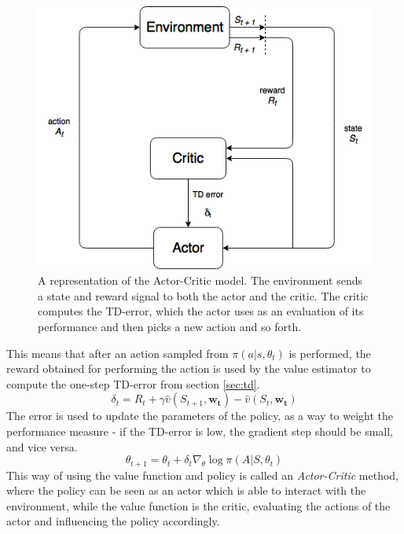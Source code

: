 \documentclass[11pt]{article}
\begin{document}
\begin{figure}[!h]
    \centering
    \includegraphics[scale = 0.5]{include/ActorCriticDiagram.png}
    \caption{A representation of the Actor-Critic model.
        The environment sends a state and reward signal to both the actor and the critic.
        The critic computes the TD-error, which the actor uses as an evaluation of its performance
        and then picks a new action and so forth.}
    \label{fig:actor-critic}
\end{figure}

This means that after an action sampled from $\pi(a|s,\theta_t)$ is performed,
the reward obtained for performing the action is used by the value estimator to
compute the one-step TD-error from section \ref{sec:td}.
\begin{equation*}
    \delta_t =  R_t + \gamma \hat{v} (S_{t+1}, \mathbf{w_t}) - \hat{v}(S_t, \mathbf{w_t})
\end{equation*}
The error is used to update the parameters of the policy,
as a way to weight the performance measure - if the TD-error is low,
the gradient step should be small, and vice versa.
\begin{equation}\label{eq:ac_theta}
    \theta_{t+1} = \theta_t + \delta_t \nabla_{\theta} \log \pi(A | S, \theta_t)
\end{equation}
This way of using the value function and policy is called an
\textit{Actor-Critic} method, where the policy can be seen as an actor
which is able to interact with the environment, while the value function
is the critic, evaluating the actions of the actor and 
influencing the policy accordingly.
\end{document}
